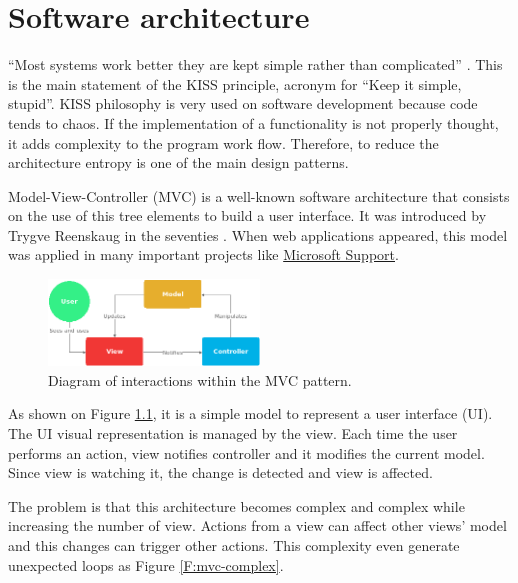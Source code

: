 \chapter{Software architecture}


“Most systems work better they are kept simple rather than complicated”
\cite{kiss-wiki}. This is the main statement of the KISS principle, acronym for
“Keep it simple, stupid”. KISS philosophy is very used on software development
because code tends to chaos. If the implementation of a functionality is not
properly thought, it adds complexity to the program work flow. Therefore, to
reduce the architecture entropy is one of the main design patterns.

Model-View-Controller (MVC) is a well-known software architecture that consists
on the use of this tree elements to build a user interface. It was introduced 
by Trygve Reenskaug in the seventies \cite{mvc-past-present}. When web
applications appeared, this model was applied in many important projects
like \href{https://support.microsoft.com}{Microsoft Support}. 


\begin{figure}[htb]
	\begin{center}
		\includegraphics[width=0.5\textwidth]{./figures/mvc.png}
		\caption{Diagram of interactions within the MVC pattern.
				 \cite{mvc-wiki}}
		\label{F:mvc}
	\end{center}
\end{figure}

As shown on Figure \ref{F:mvc}, it is a simple model to represent
a user interface (UI). The UI visual representation is managed by the view.
Each time the user performs an action, view notifies controller and it modifies
the current model. Since view is watching it, the change is detected and view
is affected.

The problem is that this architecture becomes complex and complex while 
increasing the number of view. Actions from a view can affect other views'
model and this changes can trigger other actions. This complexity even
generate unexpected loops as Figure \ref{F:mvc-complex}.


